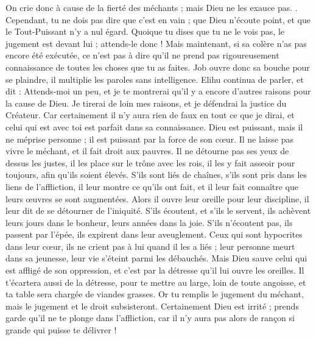 \begin{multicols}{2}
On crie donc à cause de la fierté des méchants ; mais Dieu ne les exauce pas.
.
Cependant, tu ne dois pas dire que c'est en vain ; que Dieu n'écoute point, et que le Tout-Puissant n'y a nul égard.
Quoique tu dises que tu ne le vois pas, le jugement est devant lui ; attends-le donc !
Mais maintenant, si sa colère n'as pas encore été exécutée, ce n'est pas à dire qu'il ne prend pas rigoureusement connaissance de toutes les choses que tu as faites.
Job ouvre donc sa bouche pour se plaindre, il multiplie les paroles sans intelligence.
\VerseOne{}Elihu continua de parler, et dit :
Attends-moi un peu, et je te montrerai qu'il y a encore d'autres raisons pour la cause de Dieu.
Je tirerai de loin mes raisons, et je défendrai la justice du Créateur.
Car certainement il n'y aura rien de faux en tout ce que je dirai, et celui qui est avec toi est parfait dans sa connaissance.
Dieu est puissant, mais il ne méprise personne ; il est puissant par la force de son cœur.
Il ne laisse pas vivre le méchant, et il fait droit aux pauvres.
Il ne détourne pas ses yeux de dessus les justes, il les place sur le trône avec les rois, il les y fait asseoir pour toujours, afin qu'ils soient élevés.
S'ils sont liés de chaînes, s'ils sont pris dans les liens de l'affliction,
il leur montre ce qu'ils ont fait, et il leur fait connaître que leurs œuvres se sont augmentées.
Alors il ouvre leur oreille pour leur discipline, il leur dit de se détourner de l'iniquité.
S'ils écoutent, et s'ils le servent, ils achèvent leurs jours dans le bonheur, leurs années dans la joie.
S'ils n'écoutent pas, ils passent par l'épée, ils expirent dans leur aveuglement.
Ceux qui sont hypocrites dans leur cœur, ils ne crient pas à lui quand il les a liés ;
leur personne meurt dans sa jeunesse, leur vie s'éteint parmi les débauchés.
Mais Dieu sauve celui qui est affligé de son oppression, et c'est par la détresse qu'il lui ouvre les oreilles.
Il t'écartera aussi de la détresse, pour te mettre au large, loin de toute angoisse, et ta table sera chargée de viandes grasses.
Or tu remplis le jugement du méchant, mais le jugement et le droit subsisteront.
Certainement Dieu est irrité ; prends garde qu'il ne te plonge dans l'affliction, car il n'y aura pas alors de rançon si grande qui puisse te délivrer !

\end{multicols}
